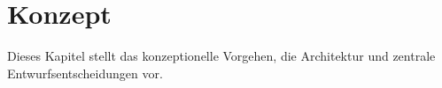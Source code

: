 \chapter{Konzept}

Dieses Kapitel stellt das konzeptionelle Vorgehen, die Architektur und zentrale Entwurfsentscheidungen vor.
